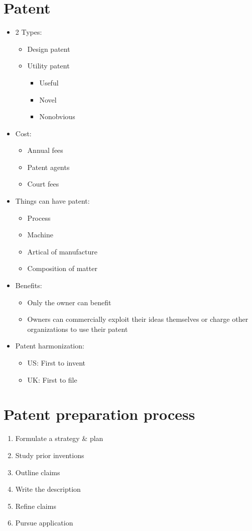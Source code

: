 \documentclass[openany,12pt,a4paper]{book}
\begin{document}
\section{Patent}
\begin{itemize}
    \item 2 Types:
    \begin{itemize}
        \item Design patent
        \item Utility patent
        \begin{itemize}
            \item Useful
            \item Novel
            \item Nonobvious
        \end{itemize}
    \end{itemize}
    \item Cost:
    \begin{itemize}
        \item Annual fees
        \item Patent agents
        \item Court fees
    \end{itemize}
    \item Things can have patent:
    \begin{itemize}
        \item Process
        \item Machine
        \item Artical of manufacture
        \item Composition of matter
    \end{itemize}
    \item Benefits:
    \begin{itemize}
        \item Only the owner can benefit
        \item Owners can commercially exploit their ideas themselves or charge other organizations to use their patent
    \end{itemize}
    \item Patent harmonization:
    \begin{itemize}
        \item US: First to invent
        \item UK: First to file
    \end{itemize}
\end{itemize}
\section{Patent preparation process}
\begin{enumerate}
    \item Formulate a strategy \& plan
    \item Study prior inventions
    \item Outline claims
    \item Write the description
    \item Refine claims
    \item Pursue application
\end{enumerate}
\end{document}
